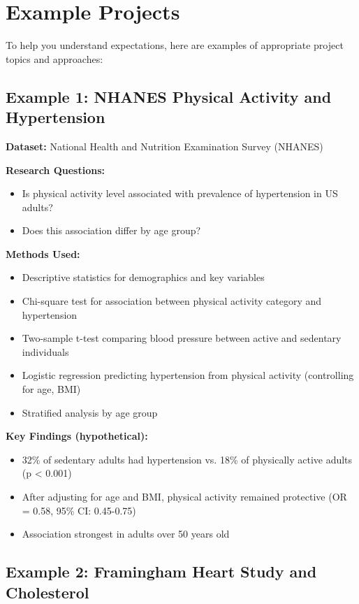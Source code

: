 \documentclass[11pt]{article}
\begin{document}
\section{Example Projects}

To help you understand expectations, here are examples of appropriate project topics and approaches:

\subsection{Example 1: NHANES Physical Activity and Hypertension}

\textbf{Dataset:} National Health and Nutrition Examination Survey (NHANES)

\textbf{Research Questions:}
\begin{itemize}
\item Is physical activity level associated with prevalence of hypertension in US adults?
\item Does this association differ by age group?
\end{itemize}

\textbf{Methods Used:}
\begin{itemize}
\item Descriptive statistics for demographics and key variables
\item Chi-square test for association between physical activity category and hypertension
\item Two-sample t-test comparing blood pressure between active and sedentary individuals
\item Logistic regression predicting hypertension from physical activity (controlling for age, BMI)
\item Stratified analysis by age group
\end{itemize}

\textbf{Key Findings (hypothetical):}
\begin{itemize}
\item 32\% of sedentary adults had hypertension vs. 18\% of physically active adults (p < 0.001)
\item After adjusting for age and BMI, physical activity remained protective (OR = 0.58, 95\% CI: 0.45-0.75)
\item Association strongest in adults over 50 years old
\end{itemize}

\subsection{Example 2: Framingham Heart Study and Cholesterol}
\end{document}
